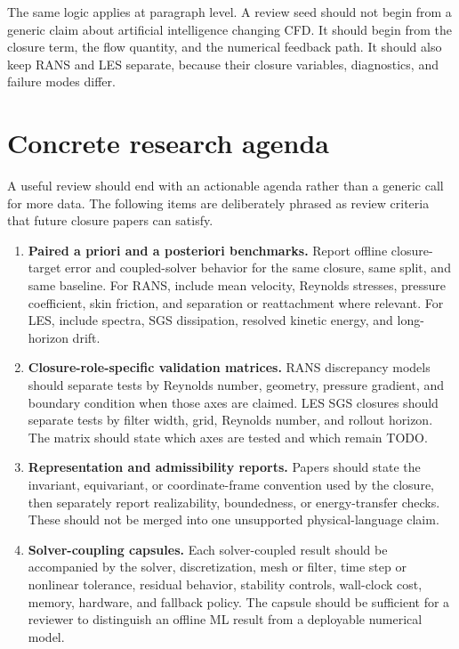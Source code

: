 \documentclass[11pt]{article}
\begin{document}
The same logic applies at paragraph level. A review seed should not begin from a generic claim about artificial intelligence changing CFD. It should begin from the closure term, the flow quantity, and the numerical feedback path. It should also keep RANS and LES separate, because their closure variables, diagnostics, and failure modes differ.

\section{Concrete research agenda}

A useful review should end with an actionable agenda rather than a generic call for more data. The following items are deliberately phrased as review criteria that future closure papers can satisfy.

\begin{enumerate}
\item \textbf{Paired a priori and a posteriori benchmarks.} Report offline closure-target error and coupled-solver behavior for the same closure, same split, and same baseline. For RANS, include mean velocity, Reynolds stresses, pressure coefficient, skin friction, and separation or reattachment where relevant. For LES, include spectra, SGS dissipation, resolved kinetic energy, and long-horizon drift.

\item \textbf{Closure-role-specific validation matrices.} RANS discrepancy models should separate tests by Reynolds number, geometry, pressure gradient, and boundary condition when those axes are claimed. LES SGS closures should separate tests by filter width, grid, Reynolds number, and rollout horizon. The matrix should state which axes are tested and which remain TODO.

\item \textbf{Representation and admissibility reports.} Papers should state the invariant, equivariant, or coordinate-frame convention used by the closure, then separately report realizability, boundedness, or energy-transfer checks. These should not be merged into one unsupported physical-language claim.

\item \textbf{Solver-coupling capsules.} Each solver-coupled result should be accompanied by the solver, discretization, mesh or filter, time step or nonlinear tolerance, residual behavior, stability controls, wall-clock cost, memory, hardware, and fallback policy. The capsule should be sufficient for a reviewer to distinguish an offline ML result from a deployable numerical model.


\end{enumerate}
\end{document}
